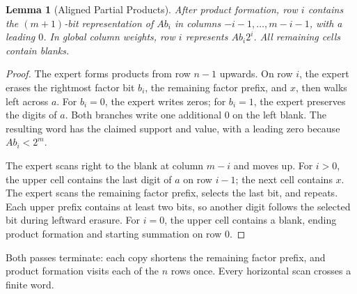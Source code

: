 \documentclass[11pt,a4paper]{article}
\newtheorem{lemma}{Lemma}
\begin{document}
\begin{lemma}[Aligned Partial Products]\label{lem:products}
After product formation, row $i$ contains the $(m+1)$-bit representation of
$A b_i$ in columns $-i-1,\ldots,m-i-1$, with a leading $0$.
In global column weights, row $i$ represents $A b_i2^i$.
All remaining cells contain blanks.
\end{lemma}
\begin{proof}
The expert forms products from row $n-1$ upwards. On row $i$, the expert
erases the rightmost factor bit $b_i$, the remaining factor prefix, and $x$,
then walks left across $a$. For $b_i=0$, the expert writes zeros; for $b_i=1$,
the expert preserves the digits of $a$. Both branches write one additional
$0$ on the left blank. The resulting word has the claimed support and value,
with a leading zero because $A b_i<2^m$.

The expert scans right to the blank at column $m-i$ and moves up.
For $i>0$, the upper cell contains the last digit of $a$ on row $i-1$;
the next cell contains $x$. The expert scans the remaining factor prefix,
selects the last bit, and repeats. Each upper prefix contains at least two
bits, so another digit follows the selected bit during leftward erasure.
For $i=0$, the upper cell contains a blank, ending product formation and
starting summation on row $0$.
\end{proof}

Both passes terminate: each copy shortens the remaining factor prefix, and
product formation visits each of the $n$ rows once. Every horizontal scan
crosses a finite word.

\newpage
\end{document}
